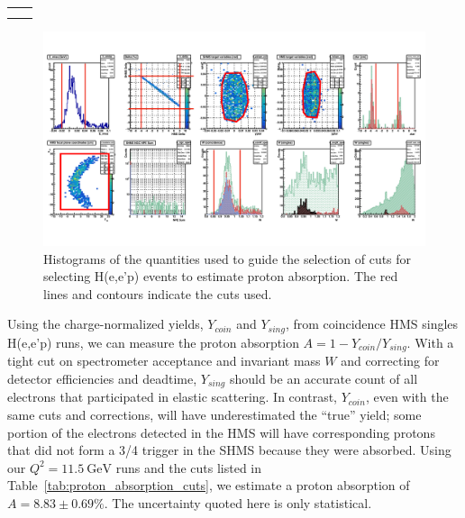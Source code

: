 \begin{table}[h]
{\begin{tabular}[t]{| l | l | l | r | r | r | r | r | r | r | r |}
             \\
        \end{tabular}
    } %
\end{table}
\vfill
\clearpage

\begin{figure}[!h]
    \centering
    \includegraphics[width=1.0\textwidth]{chap4/proton_absorption_plots.pdf}
    \caption{Histograms of the quantities used to guide the selection of cuts
             for selecting H(e,e'p) events to estimate proton absorption.
             The red lines and contours indicate the cuts used.}
    \label{fig:proton_absorption_plots}
\end{figure}

Using the charge-normalized yields, $Y_{coin}$ and $Y_{sing}$, from coincidence
HMS singles H(e,e'p) runs, we can measure the proton absorption
$A=1-Y_{coin}/Y_{sing}$.
With a tight cut on spectrometer acceptance and invariant mass $W$ and
correcting for detector efficiencies and deadtime, $Y_{sing}$ should be an
accurate count of all electrons that participated in elastic scattering.
In contrast, $Y_{coin}$, even with the same cuts and corrections, will have
underestimated the ``true'' yield; some portion of the electrons detected in the
HMS will have corresponding protons that did not form a 3/4 trigger in the SHMS
because they were absorbed.
Using our $Q^2 = \SI{11.5}{\giga\electronvolt}$ runs and the cuts listed in
Table~\ref{tab:proton_absorption_cuts}, we estimate a proton absorption of $A=8.83 \pm 0.69 \%$.
The uncertainty quoted here is only statistical.

